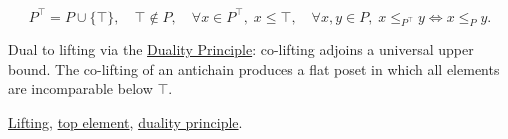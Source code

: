 \begin{remark*}
\[
P^{\top} = P \cup \{\top\},\quad
\top \notin P,\quad
\forall x \in P^{\top},\; x \leq \top,\quad
\forall x,y \in P,\; x \leq_{P^\top} y \Leftrightarrow x \leq_P y.
\]
\end{remark*}

\begin{remark*}[Interpretation]
Dual to lifting via the
\hyperref[prop:duality-principle]{Duality Principle}: co-lifting adjoins
a universal upper bound.  The co-lifting of an antichain produces a flat
poset in which all elements are incomparable below $\top$.
\end{remark*}

\begin{remark*}[Dependencies]
\hyperref[def:lifting]{Lifting},
\hyperref[def:top-element]{top element},
\hyperref[prop:duality-principle]{duality principle}.
\end{remark*}

